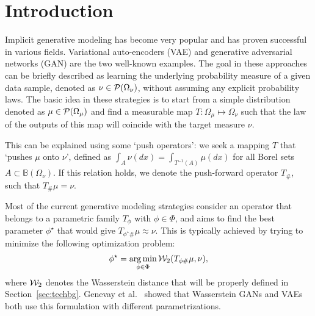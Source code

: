 
\section{Introduction}



Implicit generative modeling has become very popular and has proven successful in various fields. Variational auto-encoders (VAE) and generative adversarial networks (GAN) are the two well-known examples. The goal in these approaches can be briefly described as learning the underlying probability measure of a given data sample, denoted as $\nu \in {\cal P}(\Omega_\nu)$, without assuming any explicit probability laws. The basic idea in these strategies is to start from a simple distribution denoted as $\mu \in {\cal P}(\Omega_\mu)$ and find a measurable map $T: \Omega_\mu \mapsto \Omega_\nu$ such that the law of the outputs of this map will coincide with the target measure $\nu$. 

This can be explained using some `push operators': we seek a mapping $T$ that `pushes $\mu$ onto $\nu$', defined as $\int_A \nu(dx) = \int_{T^{-1}(A)} \mu(dx) $ for all Borel sets $A \subset \mathbb{B}(\Omega_\nu)$. If this relation holds, we denote the push-forward operator $T_\#$, such that $T_\# \mu = \nu$.

Most of the current generative modeling strategies consider an operator that belongs to a parametric family $T_{\phi}$ with $\phi \in \Phi$, and aims to find the best parameter $\phi^\star$ that would give $T_{\phi^\star \#}\mu \approx \nu$. This is typically achieved by trying to minimize the following optimization problem:
\begin{align}
\phi^\star = \operatorname*{arg\min}_{\phi \in \Phi} {\cal W}_2(T_{\phi \#}\mu, \nu),
\end{align}
where ${\cal W}_2$ denotes the Wasserstein distance that will be properly defined in Section~\ref{sec:techbg}. Genevay et al.\ \cite{genevay2017gan} showed that Wasserstein GANs and VAEs both use this formulation with different parametrizations. 
